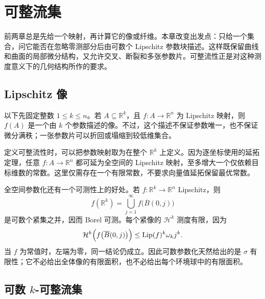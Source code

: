 \section{可整流集}
\label{b1:sec:1901}

前两章总是先给一个映射，再计算它的像或纤维。本章改变出发点：只给一个集合，问它能否在忽略零测部分后由可数个 Lipschitz 参数块描述。这样既保留曲线和曲面的局部微分结构，又允许交叉、断裂和多张参数片。可整流性正是对这种测度意义下的几何结构所作的要求。


\subsection{Lipschitz 像}
\label{b1:subsec:190101}

以下先固定整数 \(1\leq k\leq n\)。若 \(A\subseteq\mathbb R^k\)，且 \(f:A\to\mathbb R^n\) 为 Lipschitz 映射，则 \(f(A)\) 是一个由 \(k\) 个参数描述的像。不过，这个描述不保证参数唯一，也不保证微分满秩；一张参数片可以折回或塌缩到较低维集合。

\ProseParagraphBreak

定义可整流性时，可以把参数映射取为在整个 \(\mathbb R^k\) 上定义。因为逐坐标使用的延拓定理，任意 \(f:A\to\mathbb R^n\) 都可延为全空间的 Lipschitz 映射，至多增大一个仅依赖目标维数的常数。这里仅需存在一个有限常数，不要求向量值延拓保留最优常数。

\ProseParagraphBreak

全空间参数化还有一个可测性上的好处。若 \(f:\mathbb R^k\to\mathbb R^n\) Lipschitz，则
\[
 f(\mathbb R^k)=\bigcup_{j=1}^{\infty}f\bigl(\overline B(0,j)\bigr)
\]
是可数个紧集之并，因而 Borel 可测。每个紧像的 \(\mathcal H^k\) 测度有限，因为
\[
 \mathcal H^k\Bigl(f\bigl(\overline B(0,j)\bigr)\Bigr)
 \leq\operatorname{Lip}(f)^k\omega_kj^k.
\]
当 \(f\) 为常值时，左端为零，同一结论仍成立。因此可数参数化天然给出的是 \(\sigma\) 有限性；它不必给出全体像的有限面积，也不必给出每个环境球中的有限面积。

\subsection{可数 \texorpdfstring{\(k\)}{k}-可整流集}
\label{b1:subsec:190102}

